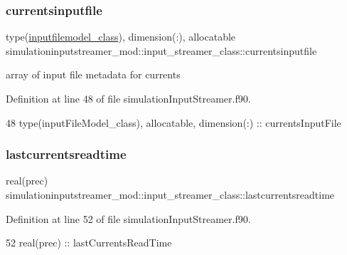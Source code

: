 \subsubsection{\texorpdfstring{currentsinputfile}{currentsinputfile}}
{\footnotesize\ttfamily type(\mbox{\hyperlink{structsimulationinputstreamer__mod_1_1inputfilemodel__class}{inputfilemodel\+\_\+class}}), dimension(\+:), allocatable simulationinputstreamer\+\_\+mod\+::input\+\_\+streamer\+\_\+class\+::currentsinputfile\hspace{0.3cm}{\ttfamily [private]}}



array of input file metadata for currents 



Definition at line 48 of file simulation\+Input\+Streamer.\+f90.


\begin{DoxyCode}
48         \textcolor{keywordtype}{type}(inputFileModel\_class), \textcolor{keywordtype}{allocatable}, \textcolor{keywordtype}{dimension(:)} :: currentsInputFile
\end{DoxyCode}
\mbox{\label{structsimulationinputstreamer__mod_1_1input__streamer__class_a375225e0aa1ed0f08363da1bafc139e3}} 
\subsubsection{\texorpdfstring{lastcurrentsreadtime}{lastcurrentsreadtime}}
{\footnotesize\ttfamily real(prec) simulationinputstreamer\+\_\+mod\+::input\+\_\+streamer\+\_\+class\+::lastcurrentsreadtime\hspace{0.3cm}{\ttfamily [private]}}



Definition at line 52 of file simulation\+Input\+Streamer.\+f90.


\begin{DoxyCode}
52         \textcolor{keywordtype}{real(prec)} :: lastCurrentsReadTime
\end{DoxyCode}
\mbox{\label{structsimulationinputstreamer__mod_1_1input__streamer__class_a281ca1f48f66bc5ce10ea815bc38dcf0}} 
